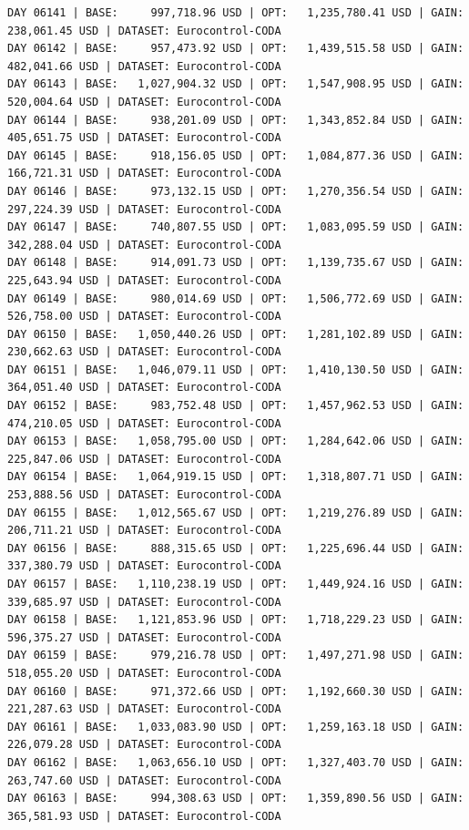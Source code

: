 \documentclass[11pt,a4paper]{article}
\begin{document}
\begin{verbatim}
DAY 06141 | BASE:     997,718.96 USD | OPT:   1,235,780.41 USD | GAIN: 238,061.45 USD | DATASET: Eurocontrol-CODA
DAY 06142 | BASE:     957,473.92 USD | OPT:   1,439,515.58 USD | GAIN: 482,041.66 USD | DATASET: Eurocontrol-CODA
DAY 06143 | BASE:   1,027,904.32 USD | OPT:   1,547,908.95 USD | GAIN: 520,004.64 USD | DATASET: Eurocontrol-CODA
DAY 06144 | BASE:     938,201.09 USD | OPT:   1,343,852.84 USD | GAIN: 405,651.75 USD | DATASET: Eurocontrol-CODA
DAY 06145 | BASE:     918,156.05 USD | OPT:   1,084,877.36 USD | GAIN: 166,721.31 USD | DATASET: Eurocontrol-CODA
DAY 06146 | BASE:     973,132.15 USD | OPT:   1,270,356.54 USD | GAIN: 297,224.39 USD | DATASET: Eurocontrol-CODA
DAY 06147 | BASE:     740,807.55 USD | OPT:   1,083,095.59 USD | GAIN: 342,288.04 USD | DATASET: Eurocontrol-CODA
DAY 06148 | BASE:     914,091.73 USD | OPT:   1,139,735.67 USD | GAIN: 225,643.94 USD | DATASET: Eurocontrol-CODA
DAY 06149 | BASE:     980,014.69 USD | OPT:   1,506,772.69 USD | GAIN: 526,758.00 USD | DATASET: Eurocontrol-CODA
DAY 06150 | BASE:   1,050,440.26 USD | OPT:   1,281,102.89 USD | GAIN: 230,662.63 USD | DATASET: Eurocontrol-CODA
DAY 06151 | BASE:   1,046,079.11 USD | OPT:   1,410,130.50 USD | GAIN: 364,051.40 USD | DATASET: Eurocontrol-CODA
DAY 06152 | BASE:     983,752.48 USD | OPT:   1,457,962.53 USD | GAIN: 474,210.05 USD | DATASET: Eurocontrol-CODA
DAY 06153 | BASE:   1,058,795.00 USD | OPT:   1,284,642.06 USD | GAIN: 225,847.06 USD | DATASET: Eurocontrol-CODA
DAY 06154 | BASE:   1,064,919.15 USD | OPT:   1,318,807.71 USD | GAIN: 253,888.56 USD | DATASET: Eurocontrol-CODA
DAY 06155 | BASE:   1,012,565.67 USD | OPT:   1,219,276.89 USD | GAIN: 206,711.21 USD | DATASET: Eurocontrol-CODA
DAY 06156 | BASE:     888,315.65 USD | OPT:   1,225,696.44 USD | GAIN: 337,380.79 USD | DATASET: Eurocontrol-CODA
DAY 06157 | BASE:   1,110,238.19 USD | OPT:   1,449,924.16 USD | GAIN: 339,685.97 USD | DATASET: Eurocontrol-CODA
DAY 06158 | BASE:   1,121,853.96 USD | OPT:   1,718,229.23 USD | GAIN: 596,375.27 USD | DATASET: Eurocontrol-CODA
DAY 06159 | BASE:     979,216.78 USD | OPT:   1,497,271.98 USD | GAIN: 518,055.20 USD | DATASET: Eurocontrol-CODA
DAY 06160 | BASE:     971,372.66 USD | OPT:   1,192,660.30 USD | GAIN: 221,287.63 USD | DATASET: Eurocontrol-CODA
DAY 06161 | BASE:   1,033,083.90 USD | OPT:   1,259,163.18 USD | GAIN: 226,079.28 USD | DATASET: Eurocontrol-CODA
DAY 06162 | BASE:   1,063,656.10 USD | OPT:   1,327,403.70 USD | GAIN: 263,747.60 USD | DATASET: Eurocontrol-CODA
DAY 06163 | BASE:     994,308.63 USD | OPT:   1,359,890.56 USD | GAIN: 365,581.93 USD | DATASET: Eurocontrol-CODA

\end{verbatim}
\end{document}
